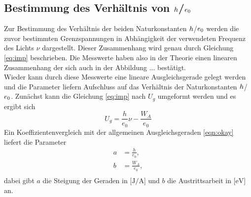 \subsection{Bestimmung des Verhältnis von $\protect h$/$\protect e_{0}$}

Zur Bestimmung des Verhältnis der beiden Naturkonstanten $\protect h$/$\protect e_{0}$ werden die zuvor bestimmten Grenzspannungen in Abhängigkeit der verwendeten Frequenz des Lichts $\nu$ dargestellt.
Dieser Zusammenhang wird genau durch Gleichung \eqref{eq:imp} beschrieben. Die Messwerte haben also in der Theorie einen linearen Zusammenhang der sich auch in der Abbildung ... bestätigt.
\\
Wieder kann durch diese Messwerte eine lineare Ausgleichsgerade gelegt werden und die Parameter liefern Aufschluss auf das Verhältnis der Naturkonstanten $\protect h$/$\protect e_{0}$.
Zunächst kann die Gleichung \eqref{eq:imp} nach $U_{g}$ umgeformt werden und es ergibt sich
\begin{equation}
U_{g} = \frac{h}{e_{0}} \nu - \frac{W_A}{e_{0}}
\end{equation}
Ein Koeffizientenvergleich mit der allgemeinen Ausgleichsgeraden \eqref{eqn:okay} liefert die Parameter
\begin{align}
a &= \frac{h}{e_{0}},\\
b &= \frac{W_A}{e_{0}},\\
\end{align}
dabei gibt $a$ die Steigung der Geraden in [$\si{\joule\per\ampere}$] und $b$ die Austrittsarbeit in [$\si{\electronvolt}$] an.